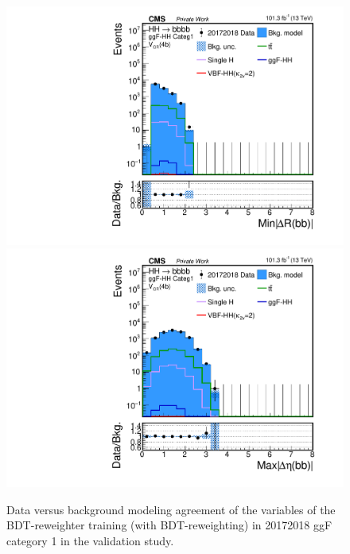 \begin{figure}[htbp!]
\begin{center}
\includegraphics[width=0.24\linewidth]{Figures/Modeling/background/plotsDatadrivenWithBDT/20172018/GGFcateg1_CR_210/Histogram/plot20172018_min_4b_deltaR_Btag4_GGFcateg1_CR_210_Histogram_log.pdf}
\includegraphics[width=0.24\linewidth]{Figures/Modeling/background/plotsDatadrivenWithBDT/20172018/GGFcateg1_CR_210/Histogram/plot20172018_max_4b_deltaEta_Btag4_GGFcateg1_CR_210_Histogram_log.pdf}
\end{center}
\caption{Data versus background modeling agreement of the variables of the BDT-reweighter training (with BDT-reweighting) in 20172018 ggF category 1 in the validation study.}
\label{bkg:fig:valbdtregvarggf1_20172018}
\end{figure}

